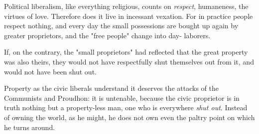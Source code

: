 Political liberalism, like everything religious, counts on \textit{respect}, 
humaneness, the virtues of love. Therefore does it live in incessant vexation. 
For in practice people respect nothing, and every day the small possessions 
are bought up again by greater proprietors, and the "{}free people"{} change 
into day- laborers.

If, on the contrary, the "{}small proprietors"{} had reflected that the great 
property was also theirs, they would not have respectfully shut themselves out 
from it, and would not have been shut out.

Property as the civic liberals understand it deserves the attacks of the 
Communists and Proudhon: it is untenable, because the civic proprietor is in 
truth nothing but a property-less man, one who is everywhere \textit{shut 
out}. Instead of owning the world, as he might, he does not own even the 
paltry point on which he turns around.

